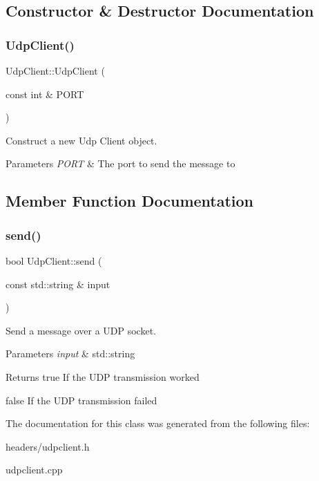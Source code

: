 \subsection{Constructor \& Destructor Documentation}
\mbox{\label{class_udp_client_a36317032b2a10d0d3f9db6be7f8ef37c}} 
\subsubsection{Udp\+Client()}
{\footnotesize\ttfamily Udp\+Client\+::\+Udp\+Client (\begin{DoxyParamCaption}\item[{const int \&}]{P\+O\+RT }\end{DoxyParamCaption})\hspace{0.3cm}{\ttfamily [inline]}}



Construct a new Udp Client object. 


\begin{DoxyParams}{Parameters}
{\em P\+O\+RT} & The port to send the message to \\
\hline
\end{DoxyParams}


\subsection{Member Function Documentation}
\mbox{\label{class_udp_client_adff031651eb312a55b66bc4ac52627a0}} 
\subsubsection{send()}
{\footnotesize\ttfamily bool Udp\+Client\+::send (\begin{DoxyParamCaption}\item[{const std\+::string \&}]{input }\end{DoxyParamCaption})}



Send a message over a U\+DP socket. 


\begin{DoxyParams}{Parameters}
{\em input} & std\+::string \\
\hline
\end{DoxyParams}
\begin{DoxyReturn}{Returns}
true If the U\+DP transmission worked 

false If the U\+DP transmission failed 
\end{DoxyReturn}


The documentation for this class was generated from the following files\+:\begin{DoxyCompactItemize}
\item 
headers/udpclient.\+h\item 
udpclient.\+cpp\end{DoxyCompactItemize}
